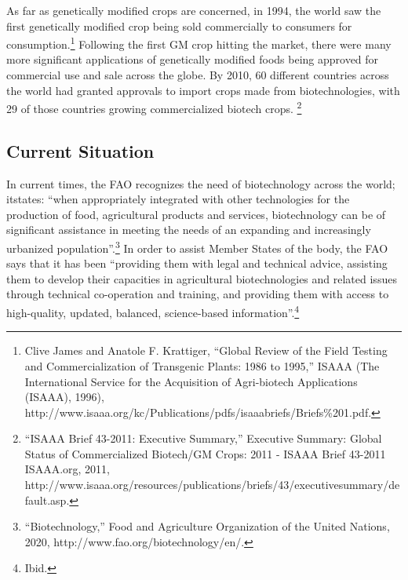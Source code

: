 \documentclass[10pt, letterpaper]{article}
\begin{document}
As far as genetically modified crops are concerned, in 1994, the world
saw the first genetically modified crop being sold commercially to
consumers for consumption.\footnote{Clive James and Anatole F.
  Krattiger, ``Global Review of the Field Testing and Commercialization
  of Transgenic Plants: 1986 to 1995,'' ISAAA (The International Service
  for the Acquisition of Agri-biotech Applications (ISAAA), 1996),
  http://www.isaaa.org/kc/Publications/pdfs/isaaabriefs/Briefs\%201.pdf.}
Following the first GM crop hitting the market, there were many more
significant applications of genetically modified foods being approved
for commercial use and sale across the globe. By 2010, 60 different
countries across the world had granted approvals to import crops made
from biotechnologies, with 29 of those countries growing commercialized
biotech crops. \footnote{``ISAAA Brief 43-2011: Executive Summary,''
  Executive Summary: Global Status of Commercialized Biotech/GM Crops:
  2011 - ISAAA Brief 43-2011 \textbar{} ISAAA.org, 2011,
  http://www.isaaa.org/resources/publications/briefs/43/executivesummary/default.asp.} \\

\subsection{Current Situation}

In current times, the FAO recognizes the need of biotechnology across
the world; itstates: ``when appropriately integrated with other
technologies for the production of food, agricultural products and
services, biotechnology can be of significant assistance in meeting the
needs of an expanding and increasingly urbanized
population''.\footnote{``Biotechnology,'' Food and Agriculture
  Organization of the United Nations, 2020,
  http://www.fao.org/biotechnology/en/.} In order to assist Member
States of the body, the FAO says that it has been ``providing them with
legal and technical advice, assisting them to develop their capacities
in agricultural biotechnologies and related issues through technical
co-operation and training, and providing them with access to
high-quality, updated, balanced, science-based information''.\footnote{Ibid.} \\
\end{document}
